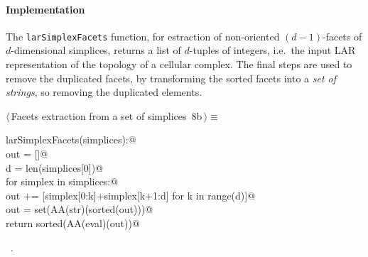 \documentclass[11pt,oneside]{article}	%
\begin{document}
\paragraph{Implementation}

The \texttt{larSimplexFacets} function, for estraction of non-oriented $(d-1)$-facets of $d$-dimensional simplices, returns a list of $d$-tuples of integers, i.e.~the input LAR representation of the topology of a cellular complex. The final steps are used to remove the duplicated facets, by transforming the sorted facets into a \emph{set of strings}, so removing the duplicated elements.
        
\begin{flushleft} \small
\begin{minipage}{\linewidth} \label{scrap8}
\protect{}$\langle\,$Facets extraction from a set of simplices\nobreak\ {\footnotesize 8b}$\,\rangle\equiv$
\vspace{-1ex}
\begin{list}{}{} \item
\mbox{}\verb@def larSimplexFacets(simplices):@\\
\mbox{}\verb@    out = []@\\
\mbox{}\verb@    d = len(simplices[0])@\\
\mbox{}\verb@    for simplex in simplices:@\\
\mbox{}\verb@        out += [simplex[0:k]+simplex[k+1:d] for k in range(d)]@\\
\mbox{}\verb@    out = set(AA(str)(sorted(out)))@\\
\mbox{}\verb@    return  sorted(AA(eval)(out))@\\
\mbox{}\verb@@{\NWsep}
\end{list}
\vspace{-1ex}
\footnotesize\addtolength{\baselineskip}{-1ex}
\begin{list}{}{\setlength{\itemsep}{-\parsep}\setlength{\itemindent}{-\leftmargin}}
\item \NWtxtMacroRefIn\ .
\end{list}
\end{minipage}\\[4ex]
\end{flushleft}
\end{document}
